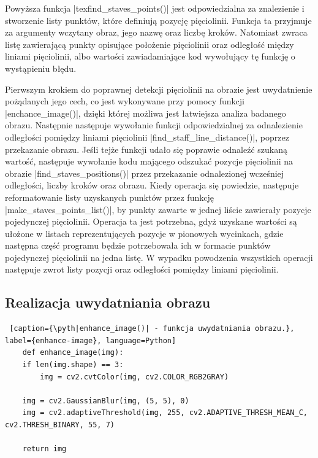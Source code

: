 Powyższa funkcja \pyth|texfind_staves_points()| jest odpowiedzialna za znalezienie i stworzenie listy punktów, które definiują pozycję pięciolinii. Funkcja ta przyjmuje za argumenty wczytany obraz, jego nazwę oraz liczbę kroków. Natomiast zwraca listę zawierającą punkty opisujące położenie pięciolinii oraz odległość między liniami pięciolinii, albo wartości zawiadamiające kod wywołujący tę funkcję o wystąpieniu błędu.

Pierwszym krokiem do poprawnej detekcji pięciolinii na obrazie jest uwydatnienie pożądanych jego cech, co jest wykonywane przy pomocy funkcji \pyth|enchance_image()|, dzięki której możliwa jest łatwiejsza analiza badanego obrazu. Następnie następuje wywołanie funkcji odpowiedzialnej za odnalezienie odległości pomiędzy liniami pięciolinii \pyth|find_staff_line_distance()|, poprzez przekazanie obrazu. Jeśli tejże funkcji udało się poprawie odnaleźć szukaną wartość, następuje wywołanie kodu mającego odszukać pozycje pięciolinii na obrazie \pyth|find_staves_positions()| przez przekazanie odnalezionej wcześniej odległości, liczby kroków oraz obrazu. Kiedy operacja się powiedzie, następuje reformatowanie listy uzyskanych punktów przez funkcję \pyth|make_staves_points_list()|, by punkty zawarte w jednej liście zawierały pozycje pojedynczej pięciolinii. Operacja ta jest potrzebna, gdyż uzyskane wartości są ułożone w listach reprezentujących pozycje w pionowych wycinkach, gdzie następna część programu będzie potrzebowała ich w formacie punktów pojedynczej pięciolinii na jedna listę. W wypadku powodzenia wszystkich operacji następuje zwrot listy pozycji oraz odległości pomiędzy liniami pięciolinii.



\subsection{Realizacja uwydatniania obrazu} \label{enhance_image_impl}

\begin{lstlisting} [caption={\pyth|enhance_image()| - funkcja uwydatniania obrazu.}, label={enhance-image}, language=Python]
	def enhance_image(img):
	if len(img.shape) == 3:
		img = cv2.cvtColor(img, cv2.COLOR_RGB2GRAY)
	
	img = cv2.GaussianBlur(img, (5, 5), 0)
	img = cv2.adaptiveThreshold(img, 255, cv2.ADAPTIVE_THRESH_MEAN_C, cv2.THRESH_BINARY, 55, 7)
	
	return img
\end{lstlisting}

